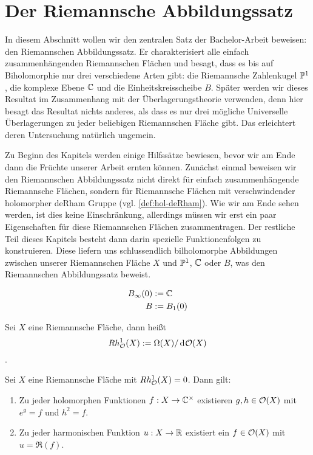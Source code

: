 \section{Der Riemannsche Abbildungssatz}
\label{sec:RMT}

In diesem Abschnitt wollen wir den zentralen Satz der Bachelor-Arbeit
beweisen: den Riemannschen Abbildungssatz. Er charakterisiert alle
einfach zusammenhängenden Riemannschen Flächen und besagt,
dass es bis auf Biholomorphie nur drei verschiedene Arten gibt: die
Riemannsche Zahlenkugel $\P^1$, die komplexe Ebene $\C$
und die Einheitskreisscheibe $B$.
Später werden wir dieses Resultat im Zusammenhang mit der
Überlagerungstheorie verwenden, denn hier besagt das Resultat nichts
anderes, als dass es nur drei mögliche Universelle Überlagerungen zu
jeder beliebigen Riemannschen Fläche gibt. Das erleichtert deren
Untersuchung natürlich ungemein.

Zu Beginn des Kapitels werden einige Hilfssätze bewiesen, bevor wir am
Ende dann die Früchte unserer Arbeit ernten können. Zunächst einmal
beweisen wir den Riemannschen Abbildungssatz nicht
direkt für einfach zusammenhängende Riemannsche Flächen, sondern für
Riemannsche Flächen mit verschwindender holomorpher deRham Gruppe
(vgl. \ref{def:hol-deRham}). Wie wir am Ende sehen werden, ist dies
keine Einschränkung, allerdings müssen wir erst ein paar Eigenschaften
für diese Riemannschen Flächen zusammentragen. Der restliche Teil
dieses Kapitels besteht dann darin spezielle Funktionenfolgen
zu konstruieren. Diese liefern uns schlussendlich bilholomorphe
Abbildungen zwischen unserer Riemannschen Fläche $X$ und $\P^1$, $\C$
oder $B$, was den Riemannschen Abbildungssatz beweist.


\begin{defin}
  \begin{align*}
    B_\infty(0) & := \C \\
    B & := B_1(0)
  \end{align*}
\end{defin}



\begin{defin}
  \label{def:hol-deRham}
  Sei $X$ eine Riemannsche Fläche, dann heißt
  \[
  Rh_\hol^1(X) := \Omega(X)/\d[\hol(X)]
  \]
  .
\end{defin}

\begin{lemma}
  \label{lemma:ex-log}
  Sei $X$ eine Riemannsche Fläche mit $Rh^1_\hol(X) = 0$. Dann gilt:
  \begin{enumerate}
  \item Zu jeder holomorphen Funktionen $f: X \ra \C^\times$ existieren
    $g, h \in \hol(X)$ mit $e^g = f$ und $h^2 = f$.
  \item Zu jeder harmonischen Funktion $u: X \ra \R$ existiert ein $f
    \in \hol(X)$ mit $u = \Re(f)$.
  \end{enumerate}
\end{lemma}

